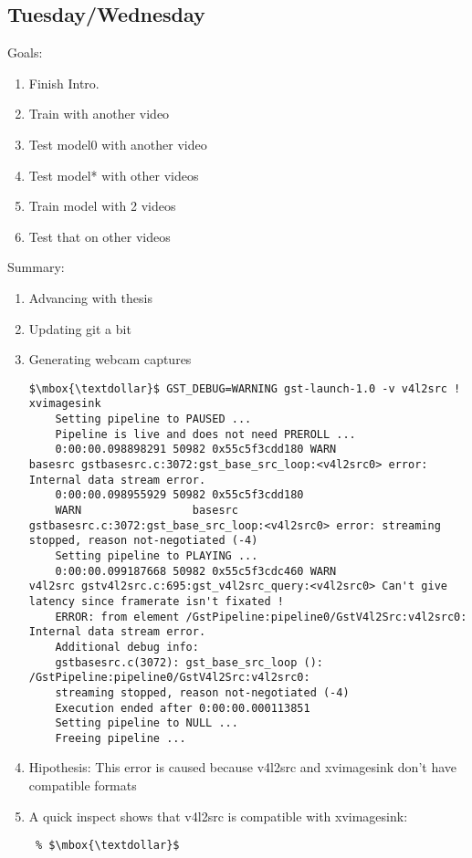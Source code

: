 \documentclass[12pt,oneside]{book}
\begin{document}
\subsection*{Tuesday/Wednesday}

Goals:
\begin{enumerate}
  \item Finish Intro.
  \item Train with another video
  \item Test model0 with another video
  \item Test model* with other videos
  \item Train model with 2 videos
  \item Test that on other videos
\end{enumerate}

Summary:
\begin{enumerate}
  \item Advancing with thesis
  \item Updating git a bit
  \item Generating webcam captures
  \begin{lstlisting}
$\mbox{\textdollar}$ GST_DEBUG=WARNING gst-launch-1.0 -v v4l2src ! xvimagesink
    Setting pipeline to PAUSED ...
    Pipeline is live and does not need PREROLL ...
    0:00:00.098898291 50982 0x55c5f3cdd180 WARN                 basesrc gstbasesrc.c:3072:gst_base_src_loop:<v4l2src0> error: Internal data stream error.
    0:00:00.098955929 50982 0x55c5f3cdd180 
    WARN                 basesrc gstbasesrc.c:3072:gst_base_src_loop:<v4l2src0> error: streaming stopped, reason not-negotiated (-4)
    Setting pipeline to PLAYING ...
    0:00:00.099187668 50982 0x55c5f3cdc460 WARN                 v4l2src gstv4l2src.c:695:gst_v4l2src_query:<v4l2src0> Can't give latency since framerate isn't fixated !
    ERROR: from element /GstPipeline:pipeline0/GstV4l2Src:v4l2src0: Internal data stream error.
    Additional debug info:
    gstbasesrc.c(3072): gst_base_src_loop (): /GstPipeline:pipeline0/GstV4l2Src:v4l2src0:
    streaming stopped, reason not-negotiated (-4)
    Execution ended after 0:00:00.000113851
    Setting pipeline to NULL ...
    Freeing pipeline ...
  \end{lstlisting}
  \item Hipothesis: This error is caused because v4l2src and xvimagesink don't have compatible formats
  \item A quick inspect shows that v4l2src is compatible with xvimagesink:
  \begin{lstlisting} % $\mbox{\textdollar}$


\end{lstlisting}
\end{enumerate}
\end{document}

